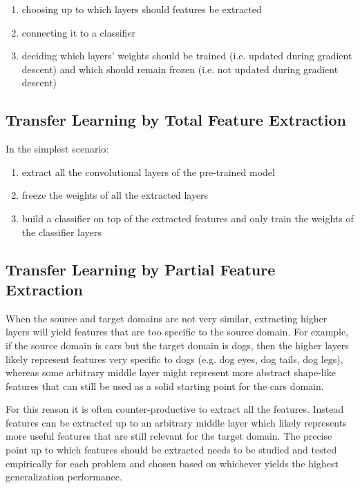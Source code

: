 \begin{enumerate}
    \item choosing up to which layers should features be extracted
    \item connecting it to a classifier
    \item deciding which layers' weights should be trained (i.e. updated during gradient descent) and which should remain frozen (i.e. not updated during gradient descent)
\end{enumerate}

\subsection{Transfer Learning by Total Feature Extraction}

In the simplest scenario:

\begin{enumerate}
    \item extract all the convolutional layers of the pre-trained model
    \item freeze the weights of all the extracted layers
    \item build a classifier on top of the extracted features and only train the weights of the classifier layers
\end{enumerate}

\subsection{Transfer Learning by Partial Feature Extraction}

When the source and target domains are not very similar, extracting higher layers will yield features that are too specific to the source domain. For example, if the source domain is cars but the target domain is dogs, then the higher layers likely represent features very specific to dogs (e.g. dog eyes, dog tails, dog legs), whereas some arbitrary middle layer might represent more abstract shape-like features that can still be used as a solid starting point for the cars domain.

For this reason it is often counter-productive to extract all the features. Instead features can be extracted up to an arbitrary middle layer which likely represents more useful features that are still relevant for the target domain. The precise point up to which features should be extracted needs to be studied and tested empirically for each problem and chosen based on whichever yields the highest generalization performance.

